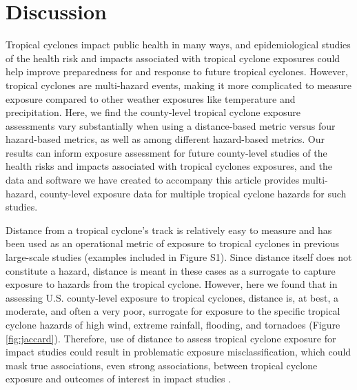 \section*{Discussion}

Tropical cyclones impact public health in many ways, and epidemiological
studies of the health risk and impacts associated with tropical cyclone
exposures could help improve preparedness for and response to future tropical
cyclones.  However, tropical cyclones are multi-hazard events, making it more
complicated to measure exposure compared to other weather
exposures like temperature and precipitation. Here, we find the county-level
tropical cyclone exposure assessments vary substantially when using a
distance-based metric versus four hazard-based metrics, as well as among
different hazard-based metrics. Our results can inform exposure assessment for
future county-level studies of the health risks and impacts associated with tropical cyclones
exposures, and the data and software we have created to accompany this article
provides multi-hazard, county-level exposure data for multiple tropical cyclone
hazards for such studies.

Distance from a tropical cyclone's track is relatively easy to measure and has
been used as an operational metric of exposure to tropical cyclones in previous
large-scale studies (examples included in Figure S1). Since distance itself
does not constitute a hazard, distance is meant in these cases as a surrogate
to capture exposure to hazards from the tropical cyclone. However, here we
found that in assessing U.S.  county-level exposure to tropical cyclones,
distance is, at best, a moderate, and often a very poor, surrogate for exposure
to the specific tropical cyclone hazards of high wind, extreme rainfall,
flooding, and tornadoes (Figure \ref{fig:jaccard}).  Therefore, use of distance
to assess tropical cyclone exposure for impact studies could result in
problematic exposure misclassification, which could mask true associations,
even strong associations, between tropical cyclone exposure and outcomes of
interest in impact studies \citep{savitz2016interpreting, armstrong1998effect}. 

